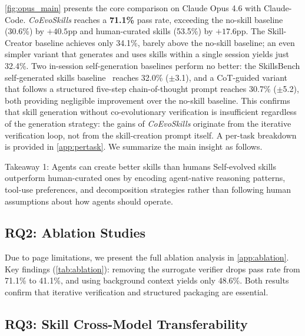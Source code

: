 \documentclass{article}
\newcommand{\method}{\textit{CoEvoSkills}\xspace}
\newcommand{\bench}{SkillsBench\xspace}
\begin{document}
\autoref{fig:opus_main} presents the core comparison on Claude Opus 4.6 with Claude-Code. \method reaches a \textbf{71.1\%} pass rate, exceeding the no-skill baseline (30.6\%) by $+40.5$pp and human-curated skills (53.5\%) by $+17.6$pp. The Skill-Creator baseline achieves only 34.1\%, barely above the no-skill baseline; an even simpler variant that generates and uses skills within a single session yields just 32.4\%. Two in-session self-generation baselines perform no better: the \bench self-generated skills baseline~\citep{li2026skillsbench} reaches 32.0\% ($\pm$3.1), and a CoT-guided variant that follows a structured five-step chain-of-thought prompt reaches 30.7\% ($\pm$5.2), both providing negligible improvement over the no-skill baseline. This confirms that skill generation without co-evolutionary verification is insufficient regardless of the generation strategy: the gains of \method originate from the iterative verification loop, not from the skill-creation prompt itself. A per-task breakdown is provided in \autoref{app:pertask}. We summarize the main insight as follows.


\begin{takeaway}{Takeaway 1: Agents can create better skills than humans}
Self-evolved skills outperform human-curated ones by encoding agent-native reasoning patterns, tool-use preferences, and decomposition strategies rather than following human assumptions about how agents should operate.
\end{takeaway}
\vspace{-1em}

\subsection{RQ2: Ablation Studies}
\label{sec:ablation}

Due to page limitations, we present the full ablation analysis in \autoref{app:ablation}. Key findings (\autoref{tab:ablation}): removing the surrogate verifier drops pass rate from 71.1\% to 41.1\%, and using background context yields only 48.6\%. Both results confirm that iterative verification and structured packaging are essential.


\subsection{RQ3: Skill Cross-Model Transferability}
\label{sec:cross_model}
\end{document}
